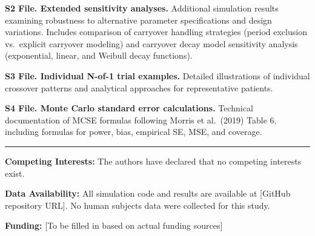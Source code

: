 \documentclass[
  11pt,
]{article}
\begin{document}
\textbf{S2 File. Extended sensitivity analyses.} Additional simulation
results examining robustness to alternative parameter specifications and
design variations. Includes comparison of carryover handling strategies
(period exclusion vs.~explicit carryover modeling) and carryover decay
model sensitivity analysis (exponential, linear, and Weibull decay
functions).

\textbf{S3 File. Individual N-of-1 trial examples.} Detailed
illustrations of individual crossover patterns and analytical approaches
for representative patients.

\textbf{S4 File. Monte Carlo standard error calculations.} Technical
documentation of MCSE formulas following Morris et al.~(2019) Table 6,
including formulas for power, bias, empirical SE, MSE, and coverage.

\begin{center}\rule{0.5\linewidth}{0.5pt}\end{center}

\textbf{Competing Interests:} The authors have declared that no
competing interests exist.

\textbf{Data Availability:} All simulation code and results are
available at {[}GitHub repository URL{]}. No human subjects data were
collected for this study.

\textbf{Funding:} {[}To be filled in based on actual funding sources{]}
\end{document}
